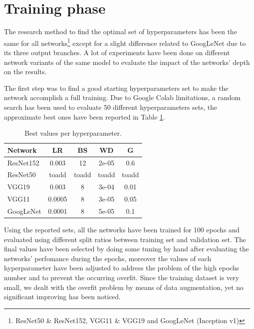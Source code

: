 \documentclass[10pt,twocolumn,letterpaper]{article}
\begin{document}
\section{Training phase}\label{training}

The research method to find the optimal set of hyperparameters has been the same for all networks\footnote {ResNet50 \& ResNet152, VGG11 \& VGG19 and GoogLeNet (Inception v1)} except for a slight difference related to GoogLeNet due to its three output branches. A lot of experiments have been done on different network variants of the same model to evaluate the impact of the networks' depth on the results.

The first step was to find a good starting hyperparameters set to make the network accomplish a full training. Due to Google Colab limitations, a random search has been used to evaluate 50 different hyperparameters sets, the approximate best ones have been reported in Table \ref{tab:sets}.

\begin{table}
   \begin{center}
      \def\arraystretch{1.5}
   \begin{tabular}{l|c|c|c|c}
   Network & LR & BS & WD & G \\
   \hline
   ResNet152 & 0.003 & 12 & 2e-05 & 0.6 \\
   \hline
   ResNet50 & toadd & toadd & toadd & toadd \\
   \hline
   VGG19 & 0.003 & 8 & 3e-04 & 0.01 \\
   \hline
   VGG11 & 0.0005 & 8 & 3e-05 & 0.05 \\
   \hline
   GoogLeNet & 0.0001 & 8 & 5e-05 & 0.1 \\
   \end{tabular}
   \end{center}
   \caption{Best values per hyperparameter.}
   \label{tab:sets}
   \end{table}



Using the reported sets, all the networks have been trained for 100 epochs and evaluated using different split ratios between training set and validation set. The final values have been selected by doing some tuning by hand after evaluating the networks' perfomance during the epochs, moreover the values of each hyperparameter have been adjusted to address the problem of the high epochs number and to prevent the occurring overfit. Since the training dataset is very small, we dealt with the overfit problem by means of data augmentation, yet no significant improving has been noticed.
\end{document}
